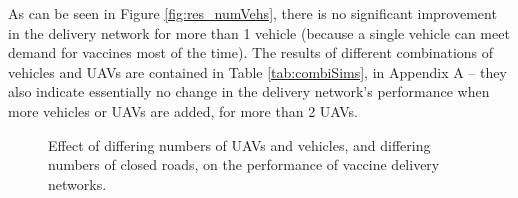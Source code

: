 As can be seen in Figure \ref{fig:res_numVehs}, there is no significant improvement in the delivery network for more than 1 vehicle (because a single vehicle can meet demand for vaccines most of the time). The results of different combinations of vehicles and UAVs are contained in Table \ref{tab:combiSims}, in Appendix A -- they also indicate essentially no change in the delivery network's performance when more vehicles or UAVs are added, for more than 2 UAVs.

\begin{figure}[ht!]{\textwidth}
\centering
\hspace{1pt}

\caption{Effect of differing numbers of UAVs and vehicles, and differing numbers of closed roads, on the performance of vaccine delivery networks.}
\end{figure}

